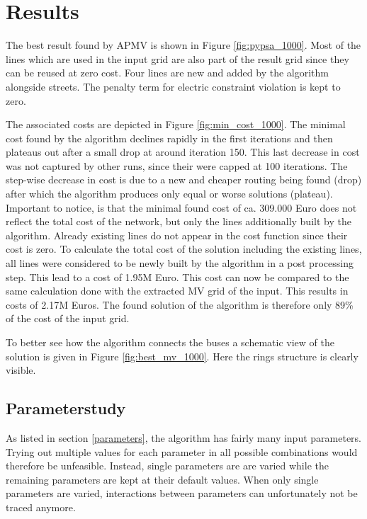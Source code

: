 %

\section{Results}



The best result found by APMV is shown in Figure \ref{fig:pypsa_1000}. Most of the lines which are used in the input grid are also part of the result grid since they can be reused at zero cost. Four lines are new and added by the algorithm alongside streets. The penalty term for electric constraint violation is kept to zero.



The associated costs are depicted in Figure \ref{fig:min_cost_1000}. The minimal cost found by the algorithm declines rapidly in the first iterations and then plateaus out after a small drop at around iteration 150. This last decrease in cost was not captured by other runs, since their were capped at 100 iterations. The step-wise decrease in cost is due to a new and cheaper routing being found (drop) after which the algorithm produces only equal or worse solutions (plateau). Important to notice, is that the minimal found cost of ca. 309.000 Euro does not reflect the total cost of the network, but only the lines additionally built by the algorithm. Already existing lines do not appear in the cost function since their cost is zero. To calculate the total cost of the solution including the existing lines, all lines were considered to be newly built by the algorithm in a post processing step. This lead to a cost of 1.95M Euro. This cost can now be compared to the same calculation done with the extracted MV grid of the input. This results in costs of 2.17M Euros. The found solution of the algorithm is therefore only 89\% of the cost of the input grid.





To better see how the algorithm connects the buses a schematic view of the solution is given in Figure \ref{fig:best_mv_1000}. Here the rings structure is clearly visible. 





\subsection{Parameterstudy}
As listed in section \ref{parameters}, the algorithm has fairly many input parameters. Trying out multiple values for each parameter in all possible combinations would therefore be unfeasible. Instead, single parameters are are varied while the remaining parameters are kept at their default values. When only single parameters are varied, interactions between parameters can unfortunately not be traced anymore. \\

